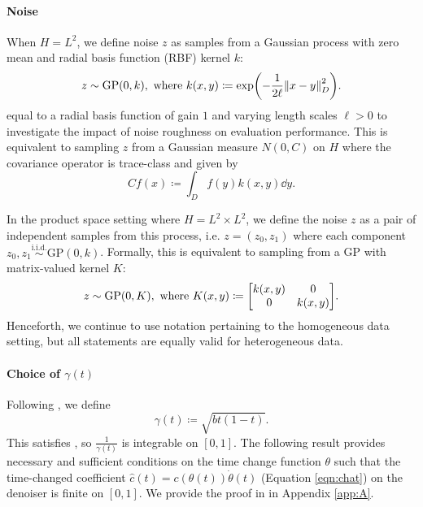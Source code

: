 \paragraph{Noise}
When \(H = L^{2}\), we define noise \(z\) as samples from a Gaussian process \citep{williams2006gaussian} with zero mean and radial basis function (RBF) kernel \(k\):
\[
  z \sim \mathrm{GP}(0, k), \text{ where } k(x, y) \coloneqq \exp(-\frac{1}{2\ell} \norm{x - y}^{2}_{D}).
\] equal to a radial basis function of gain \(1\) and varying length scales \(\ell > 0\) to investigate the impact of noise roughness on evaluation performance. This is equivalent to sampling \(z\) from a Gaussian measure \(N(0, C)\) on \(H\) where the covariance operator is trace-class and given by
\[
  Cf(x) \coloneqq \int_{D} f(y) k(x, y) \dd{y}.
\]

In the product space setting where \(H = L^{2} \times L^{2}\), we define the noise \(z\) as a pair of independent samples from this process, i.e. \(z = (z_{0}, z_{1})\) where each component \(z_{0}, z_{1} \overset{\text{i.i.d.}}{\sim} \mathrm{GP}(0, k)\). Formally, this is equivalent to sampling from a GP with matrix-valued kernel \(K\):
\[
  z \sim \mathrm{GP}(0, K), \text{ where } K(x, y) \coloneqq \mqty[k(x,y) & 0 \\ 0 & k(x,y)].
\]
Henceforth, we continue to use notation pertaining to the homogeneous data setting, but all statements are equally valid for heterogeneous data.

\paragraph{Choice of \(\gamma(t)\)} Following \citep{albergo2023stochasticinterpolantsunifyingframework}, we define
\[
  \gamma(t) \coloneqq \sqrt{bt(1-t)}.
\]
This satisfies , so \(\frac{1}{\gamma(t)}\) is integrable on \([0, 1]\). The following result provides necessary and sufficient conditions on the time change function \(\theta\) such that the time-changed coefficient \(\hat{c}(t) = c(\theta(t)) \dot{\theta}(t)\) (Equation \ref{eqn:chat}) on the denoiser is finite on \([0, 1]\). We provide the proof in  in Appendix \ref{app:A}.


